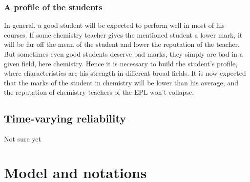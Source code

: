 \documentclass[12pt,a4paper,notitlepage]{article}
\begin{document}
\subsubsection*{A profile of the students}
In general, a good student will be expected to perform well in most of his courses. If some chemistry teacher gives the mentioned student a lower mark, it will be far off the mean of the student and lower the reputation of the teacher.\\
But sometimes even good students deserve bad marks, they simply are bad in a given field, here chemistry. Hence it is necessary to build the student's profile, where characteristics are his strength in different broad fields. It is now expected that the marks of the student in chemistry will be lower than his average, and the reputation of chemistry teachers of the EPL won't collapse.

\subsection*{Time-varying reliability}
Not sure yet

\section*{Model and notations}

\end{document}
